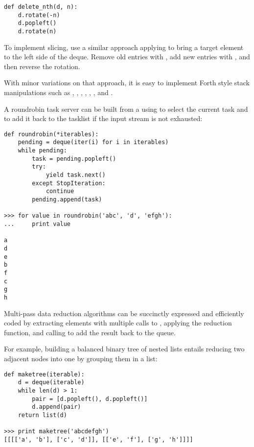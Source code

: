 \begin{verbatim}
def delete_nth(d, n):
    d.rotate(-n)
    d.popleft()
    d.rotate(n)
\end{verbatim}

To implement  slicing, use a similar approach applying
 to bring a target element to the left side of the deque.
Remove old entries with , add new entries with
, and then reverse the rotation.

With minor variations on that approach, it is easy to implement Forth style
stack manipulations such as , , , ,
, , and .

A roundrobin task server can be built from a  using
 to select the current task and 
to add it back to the tasklist if the input stream is not exhausted:

\begin{verbatim}
def roundrobin(*iterables):
    pending = deque(iter(i) for i in iterables)
    while pending:
        task = pending.popleft()
        try:
            yield task.next()
        except StopIteration:
            continue
        pending.append(task)

>>> for value in roundrobin('abc', 'd', 'efgh'):
...     print value

a
d
e
b
f
c
g
h

\end{verbatim}


Multi-pass data reduction algorithms can be succinctly expressed and
efficiently coded by extracting elements with multiple calls to
, applying the reduction function, and calling
 to add the result back to the queue.

For example, building a balanced binary tree of nested lists entails
reducing two adjacent nodes into one by grouping them in a list:

\begin{verbatim}
def maketree(iterable):
    d = deque(iterable)
    while len(d) > 1:
        pair = [d.popleft(), d.popleft()]
        d.append(pair)
    return list(d)

>>> print maketree('abcdefgh')
[[[['a', 'b'], ['c', 'd']], [['e', 'f'], ['g', 'h']]]]

\end{verbatim}



